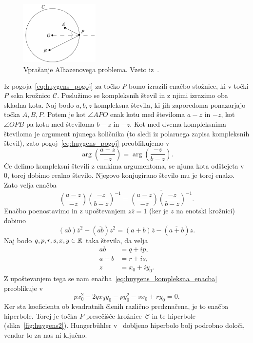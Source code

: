\begin{figure}[h]
    \centering
    \includegraphics[width=0.35\textwidth]{images/alhazen/huygens1.png}
    \caption[Nastavek Huygensovega reševanja]{Vprašanje Alhazenovega problema. Vzeto iz~\cite[str.\ 37]{nishimura2018}.}
    \label{fig:huygens1}
\end{figure}

Iz pogoja~\ref{eq:huygens_pogoj} za točko $P$ bomo izrazili enačbo stožnice, ki v točki $P$ seka krožnico $\mathcal{C}$. Poslužimo se kompleksnih števil in z njimi izrazimo oba skladna kota. Naj bodo $a, b, z$ kompleksna števila, ki jih zaporedoma ponazarjajo točka $A, B, P$. Potem je kot $\angle APO$ enak kotu med številoma $a-z$ in $-z$, kot $\angle OPB$ pa kotu med številoma $b-z$ in $-z$. Kot med dvema kompleksnima številoma je argument njunega količnika (to sledi iz polarnega zapisa kompleksnih števil), zato pogoj~\ref{eq:huygens_pogoj} preoblikujemo v
$$ \arg \left(\frac{a-z}{-z}\right) = \arg \left(\frac{-z}{b-z}\right). $$
Če delimo kompleksni števili z enakima argumentoma, se njuna kota odštejeta v $0$, torej dobimo realno število. Njegovo konjugirano število mu je torej enako. Zato velja enačba
\begin{equation*}
    \left(\frac{a-z}{-z}\right) \left(\frac{-z}{b-z}\right)^{-1} = \overline{\left(\frac{a-z}{-z}\right) \left(\frac{-z}{b-z}\right)^{-1}}.
\end{equation*}
Enačbo poenostavimo in z upoštevanjem $z \overline{z} = 1$ (ker je $z$ na enotski krožnici) dobimo
\begin{equation}
    \label{eq:huygens_kompleksna_enacba}
    (ab) \overline{z}^2 - (\overline{ab}) z^2 = (a+b) \overline{z} - (\overline{a+b}) z.
\end{equation}
Naj bodo $q, p, r, s, x, y \in \mathbb R$ taka števila, da velja
\begin{align*}
    ab &= q + i p, \\
    a + b &= r + i s, \\
    z &= x_0 + i y_0.
\end{align*}
Z upoštevanjem tega se nam enačba~\ref{eq:huygens_kompleksna_enacba} preoblikuje v
\begin{equation*}
    px_0^2 -2qx_0y_0 -py_0^2 - sx_0 + ry_0 = 0.
\end{equation*}
Ker sta koeficienta ob kvadratnih členih različno predznačena, je to enačba hiperbole. Torej je točka $P$ presečišče krožnice~$\mathcal{C}$ in te hiperbole (slika~\ref{fig:huygens2}). Hungerbühler v~\cite{hungerbuhler1992} dobljeno hiperbolo bolj podrobno določi, vendar to za nas ni ključno. 

